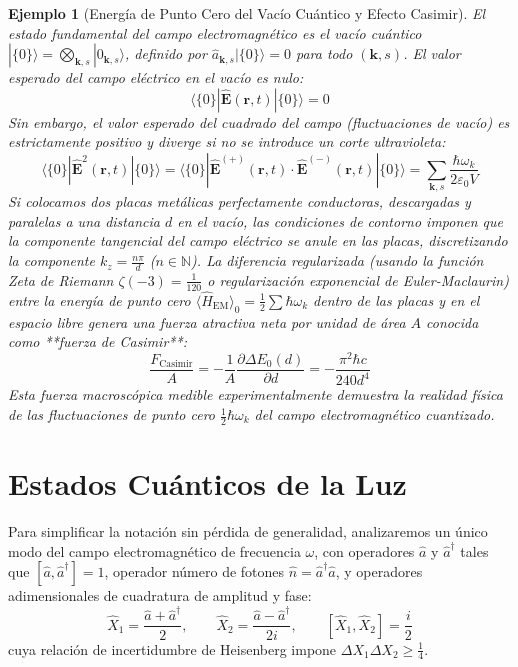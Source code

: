 \documentclass[11pt,a4paper]{book}
\newtheorem{ejemplo}{Ejemplo}[chapter]
\begin{document}
\begin{ejemplo}[Energía de Punto Cero del Vacío Cuántico y Efecto Casimir]
El estado fundamental del campo electromagnético es el vacío cuántico $|\{0\}\rangle = \bigotimes_{\mathbf{k},s} |0_{\mathbf{k},s}\rangle$, definido por $\hat{a}_{\mathbf{k},s}|\{0\}\rangle = 0$ para todo $(\mathbf{k}, s)$. El valor esperado del campo eléctrico en el vacío es nulo:
\[
\langle \{0\} | \hat{\mathbf{E}}(\mathbf{r}, t) | \{0\} \rangle = 0
\]
Sin embargo, el valor esperado del cuadrado del campo (fluctuaciones de vacío) es estrictamente positivo y diverge si no se introduce un corte ultravioleta:
\[
\langle \{0\} | \hat{\mathbf{E}}^2(\mathbf{r}, t) | \{0\} \rangle = \langle \{0\} | \hat{\mathbf{E}}^{(+)}(\mathbf{r}, t) \cdot \hat{\mathbf{E}}^{(-)}(\mathbf{r}, t) | \{0\} \rangle = \sum_{\mathbf{k}, s} \frac{\hbar \omega_k}{2\varepsilon_0 V}
\]
Si colocamos dos placas metálicas perfectamente conductoras, descargadas y paralelas a una distancia $d$ en el vacío, las condiciones de contorno imponen que la componente tangencial del campo eléctrico se anule en las placas, discretizando la componente $k_z = \frac{n\pi}{d}$ ($n \in \mathbb{N}$). La diferencia regularizada (usando la función Zeta de Riemann $\zeta(-3) = \frac{1}{120}$ o regularización exponencial de Euler-Maclaurin) entre la energía de punto cero $\langle \hat{H}_{\text{EM}} \rangle_0 = \frac{1}{2}\sum \hbar\omega_k$ dentro de las placas y en el espacio libre genera una fuerza atractiva neta por unidad de área $A$ conocida como **fuerza de Casimir**:
\begin{equation}
\frac{F_{\text{Casimir}}}{A} = -\frac{1}{A}\frac{\partial \Delta E_0(d)}{\partial d} = -\frac{\pi^2 \hbar c}{240 d^4}
\end{equation}
Esta fuerza macroscópica medible experimentalmente demuestra la realidad física de las fluctuaciones de punto cero $\frac{1}{2}\hbar\omega_k$ del campo electromagnético cuantizado.
\end{ejemplo}

\section{Estados Cuánticos de la Luz}

Para simplificar la notación sin pérdida de generalidad, analizaremos un único modo del campo electromagnético de frecuencia $\omega$, con operadores $\hat{a}$ y $\hat{a}^\dagger$ tales que $[\hat{a}, \hat{a}^\dagger] = 1$, operador número de fotones $\hat{n} = \hat{a}^\dagger \hat{a}$, y operadores adimensionales de cuadratura de amplitud y fase:
\begin{equation}
\hat{X}_1 = \frac{\hat{a} + \hat{a}^\dagger}{2}, \qquad \hat{X}_2 = \frac{\hat{a} - \hat{a}^\dagger}{2i}, \qquad [\hat{X}_1, \hat{X}_2] = \frac{i}{2}
\end{equation}
cuya relación de incertidumbre de Heisenberg impone $\Delta X_1 \Delta X_2 \geq \frac{1}{4}$.
\end{document}
